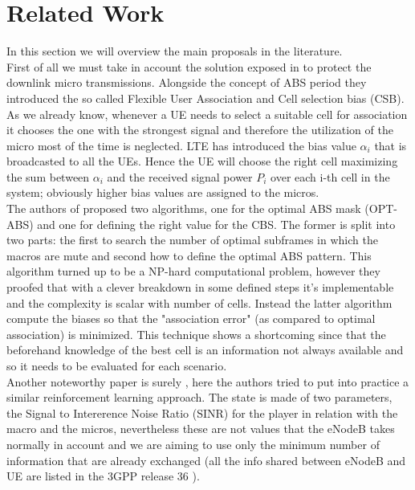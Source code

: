 \documentclass[conference,10pt]{IEEEtran}
\begin{document}
\section{Related Work}\label{sec:sota}
In this section we will overview the main proposals in the literature.\\
First of all we must take in account the solution exposed in \cite{deb2014algorithms} to protect the downlink micro transmissions. Alongside the concept of ABS period they introduced the so called Flexible User Association and Cell selection bias (CSB). As we already know, whenever a UE needs to select a suitable cell for association it chooses the one with the strongest signal and therefore the utilization of the micro most of the time is neglected. LTE has introduced the bias value $\alpha_i$ that is broadcasted to all the UEs. Hence the UE will choose the right cell maximizing the sum between $\alpha_i$ and the received signal power $P_i$ over each i-th cell in the system; obviously higher bias values are assigned to the micros.\\
The authors of \cite{deb2014algorithms} proposed two algorithms, one for the optimal ABS mask (OPT-ABS) and one for defining the right value for the CBS. The former is split into two parts: the first to search the number of optimal subframes in which the macros are mute and second how to define the optimal ABS pattern. This algorithm turned up to be a NP-hard computational problem, however they proofed that with a clever breakdown in some defined steps it's implementable and the complexity is scalar with number of cells. Instead the latter algorithm compute the biases so that the "association error" (as compared to optimal association) is minimized. This technique shows a shortcoming since that the beforehand knowledge of the best cell is an information not always available and so it needs to be evaluated for each scenario.\\
Another noteworthy paper is surely \cite{simsek2013enhanced}, here the authors tried to put into practice a similar reinforcement learning approach. The state is made of two parameters, the Signal to Intererence Noise Ratio (SINR) for the player in relation with the macro and the micros, nevertheless these are not values that the eNodeB takes normally in account and we are aiming to use only the minimum number of information that are already exchanged (all the info shared between eNodeB and UE are listed in the 3GPP release 36 \cite{etsi2017136}). 
\end{document}
